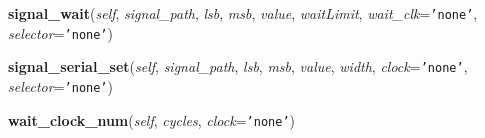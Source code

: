     \vspace{0.5ex}

\hspace{.8\funcindent}\begin{boxedminipage}{\funcwidth}

    \raggedright \textbf{signal\_wait}(\textit{self}, \textit{signal\_path}, \textit{lsb}, \textit{msb}, \textit{value}, \textit{waitLimit}, \textit{wait\_clk}={\tt \texttt{'}\texttt{none}\texttt{'}}, \textit{selector}={\tt \texttt{'}\texttt{none}\texttt{'}})

\setlength{\parskip}{2ex}
\setlength{\parskip}{1ex}
    \end{boxedminipage}

    \label{htd_player_ui:htd_player_ui:signal_serial_set}

    \vspace{0.5ex}

\hspace{.8\funcindent}\begin{boxedminipage}{\funcwidth}

    \raggedright \textbf{signal\_serial\_set}(\textit{self}, \textit{signal\_path}, \textit{lsb}, \textit{msb}, \textit{value}, \textit{width}, \textit{clock}={\tt \texttt{'}\texttt{none}\texttt{'}}, \textit{selector}={\tt \texttt{'}\texttt{none}\texttt{'}})

\setlength{\parskip}{2ex}
\setlength{\parskip}{1ex}
    \end{boxedminipage}

    \label{htd_player_ui:htd_player_ui:wait_clock_num}

    \vspace{0.5ex}

\hspace{.8\funcindent}\begin{boxedminipage}{\funcwidth}

    \raggedright \textbf{wait\_clock\_num}(\textit{self}, \textit{cycles}, \textit{clock}={\tt \texttt{'}\texttt{none}\texttt{'}})

\setlength{\parskip}{2ex}
\setlength{\parskip}{1ex}
    \end{boxedminipage}

    \label{htd_player_ui:htd_player_ui:wait_clock_edge}

